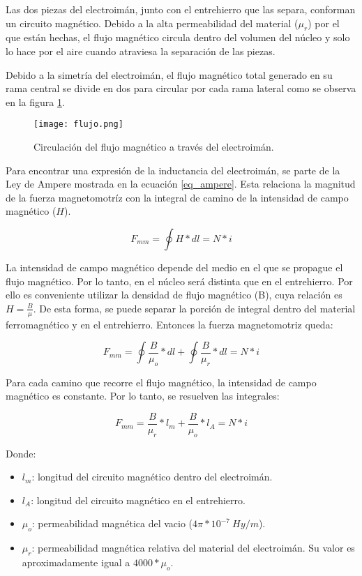 \noindent Las dos piezas del electroimán, junto con el entrehierro que las separa, conforman un circuito magnético. Debido a la alta permeabilidad del material ($\mu_{r}$) por el que están hechas, el flujo magnético circula dentro del volumen del núcleo y solo lo hace por el aire cuando atraviesa la separación de las piezas.

\noindent Debido a la simetría del electroimán, el flujo magnético total generado en su rama central se divide en dos para circular por cada rama lateral como se observa en la figura \ref{fig:img_flujo}.

\begin{figure}[H]
	\centering
	\texttt{[image: flujo.png]}
	\caption{Circulación del flujo magnético a través del electroimán.}
	\label{fig:img_flujo}
\end{figure}

\noindent Para encontrar una expresión de la inductancia del electroimán, se parte de la Ley de Ampere mostrada en la ecuación \ref{eq_ampere}. Esta relaciona la magnitud de la fuerza magnetomotríz con la integral de camino de la intensidad de campo magnético ($H$).

\begin{equation} \label{eq_ampere}
	F_{mm}=\oint{H*dl}=N*i
\end{equation}

\noindent La intensidad de campo magnético depende del medio en el que se propague el flujo magnético. Por lo tanto, en el núcleo será distinta que en el entrehierro. Por ello es conveniente utilizar la densidad de flujo magnético (B), cuya relación es $H=\frac{B}{\mu}$. De esta forma, se puede separar la porción de integral dentro del material ferromagnético y en el entrehierro. Entonces la fuerza magnetomotriz queda:

\begin{equation} 
	F_{mm}=\oint{\frac{B}{\mu_{o}}*dl}+\oint{\frac{B}{\mu_{r}}*dl}=N*i
\end{equation}

\noindent Para cada camino que recorre el flujo magnético, la intensidad de campo magnético es constante. Por lo tanto, se resuelven las integrales:

\begin{equation}\label{eq_fuerza-mm}
	F_{mm}=\frac{B}{\mu_{r}}*l_{m}+\frac{B}{\mu_{o}}*l_{A}=N*i
\end{equation}

Donde:
\begin{itemize}
	\item $l_{m}$: longitud del circuito magnético dentro del electroimán.
	\item $l_{A}$: longitud del circuito magnético en el entrehierro.
	\item $\mu_{o}$: permeabilidad magnética del vacio ($4 \pi * 10^{-7}\:Hy/m$).
	\item $\mu_{r}$: permeabilidad magnética relativa del material del electroimán. Su valor es aproximadamente igual a $4000 * \mu_{o}$.
	
\end{itemize}

